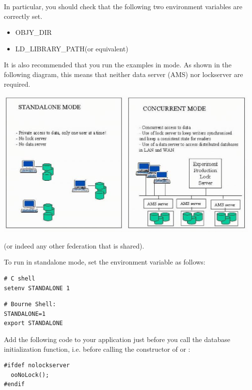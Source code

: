 \par

In particular, you should check that the following two environment variables
are correctly set.
\begin{itemize}

\item OBJY_DIR
\item LD_LIBRARY_PATH(or equivalent)\end{itemize}

\par

It is also recommended that you run the examples in  mode. As shown in
the following diagram, this means that neither data server (AMS) nor lockserver are required.
\par

\includegraphics[width=.7\linewidth, scale=.5]{sa-vs-ls}

\par
{} (or indeed
any other federation that is shared).
\par

To run in standalone mode, set the environment variable as follows:
\begin{verbatim}
# C shell
setenv STANDALONE 1
\end{verbatim}

\begin{verbatim}
# Bourne Shell: 
STANDALONE=1 
export STANDALONE 
\end{verbatim}

\par

Add the following code to your application just before you call the
database initialization function, i.e. before calling the constructor 
of  or :
\begin{verbatim}
#ifdef nolockserver 
  ooNoLock(); 
#endif
\end{verbatim}

